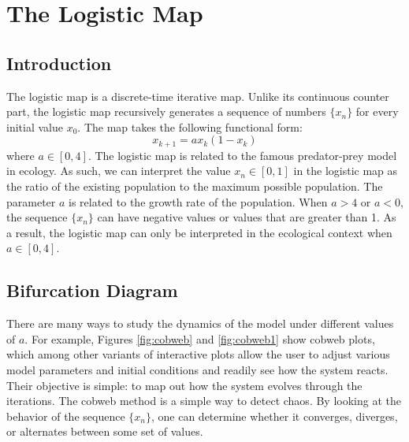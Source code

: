 \documentclass[twocolumn,amsmath,amssymb,aps]{revtex4}
\begin{document}
\section{The Logistic Map}

\subsection{Introduction}
The logistic map is a discrete-time iterative map. Unlike its continuous counter part, the logistic map recursively generates a sequence of numbers $\{x_n\}$ for every initial value $x_0$. The map takes the following functional form: 
\begin{equation*}
x_{k+1} = ax_k(1-  x_k)
\end{equation*}
where $a \in [0,4]$. The logistic map is related to the famous predator-prey model in ecology. As such, we can interpret the value $x_n \in [0,1]$ in the logistic map as the ratio of the existing population to the maximum possible population. The parameter $a$ is related to the growth rate of the population. When $a > 4$ or $a<0$, the sequence $\{x_n\}$ can have negative values or values that are greater than 1. As a result, the logistic map can only be interpreted in the ecological context when $a\in [0,4]$.

\subsection{Bifurcation Diagram}

There are many ways to study the dynamics of the model under different values of $a$. For example, Figures \ref{fig:cobweb} and \ref{fig:cobweb1} show cobweb plots, which among other variants of interactive plots allow the user to adjust various model parameters and initial conditions and readily see how the system reacts. Their objective is simple: to map out how the system evolves through the iterations. The cobweb method is a simple way to detect chaos. By looking at the behavior of the sequence $\{x_n\}$, one can determine whether it converges, diverges, or alternates between some set of values. 
\end{document}
